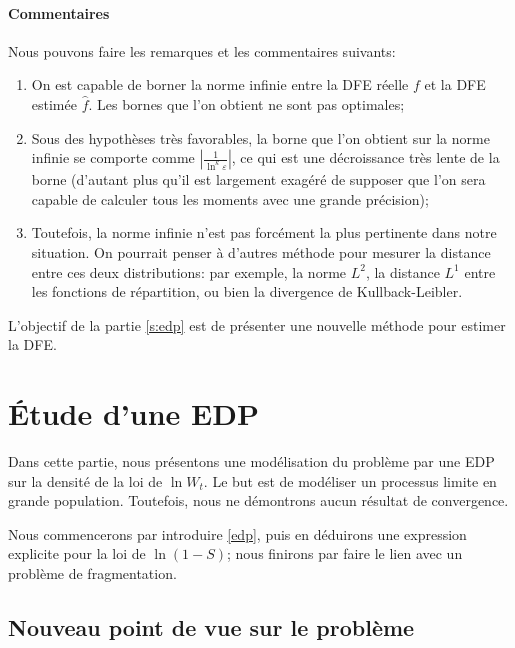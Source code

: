 \documentclass[12pt]{article}
\newcommand{\abs}[1]{\left|#1\right|}
\begin{document}
\paragraph{Commentaires}

Nous pouvons faire les remarques et les commentaires suivants:
\begin{enumerate}
\item On est capable de borner la norme infinie entre la DFE réelle $f$ et la DFE estimée $\hat{f}$. Les bornes que l'on obtient ne sont pas optimales;
\item Sous des hypothèses très favorables, la borne que l'on obtient sur la norme infinie se comporte comme $\abs{\frac{1}{\ln^k\varepsilon}}$, ce qui est une décroissance très lente de la borne (d'autant plus qu'il est largement exagéré de supposer que l'on sera capable de calculer tous les moments avec une grande précision);
\item Toutefois, la norme infinie n'est pas forcément la plus pertinente dans notre situation. On pourrait penser à d'autres méthode pour mesurer la distance entre ces deux distributions: par exemple, la norme $L^2$, la distance $L^1$ entre les fonctions de répartition, ou bien la divergence de Kullback-Leibler.
\end{enumerate}

L'objectif de la partie \ref{s:edp} est de présenter une nouvelle méthode pour estimer la DFE.


\FloatBarrier
\section{Étude d'une EDP\label{s:edp}}

Dans cette partie, nous présentons une modélisation du problème par une EDP sur la densité de la loi de $\ln W_t$. Le but est de modéliser un processus limite en grande population. Toutefois, nous ne démontrons aucun résultat de convergence.%

Nous commencerons par introduire \eqref{edp}, puis en déduirons une expression explicite pour la loi de $\ln(1-S)$; nous finirons par faire le lien avec un problème de fragmentation.

\subsection{Nouveau point de vue sur le problème}
\end{document}
